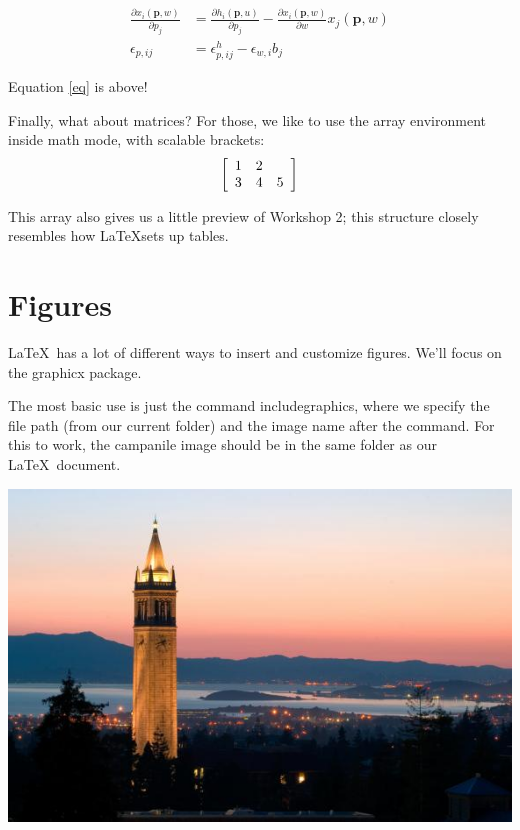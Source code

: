 \documentclass{article}
\begin{document}

\begin{align}
\frac{\partial x_i(\mathbf{p},w)}{\partial p_j}&= \frac{\partial h_i(\mathbf{p},u)}{\partial p_j}-\frac{\partial x_i(\mathbf{p},w)}{\partial w}x_j(\mathbf{p},w) \label{eq} \\
\epsilon_{p,ij} &=\epsilon^h_{p,ij} - \epsilon_{w,i}b_j
\end{align}

Equation \ref{eq} is above!


Finally, what about matrices? For those, we like to use the array environment inside math mode, with scalable brackets:
\[ \left[
\begin{array}{ c c c }
1 & 2 \\
3 & 4 & 5
\end{array} \right]
\]

This array also gives us a little preview of Workshop 2; this structure closely resembles how \LaTeX sets up tables.


\section{Figures}

\LaTeX\ has a lot of different ways to insert and customize figures. We'll focus on the graphicx package.

The most basic use is just the command includegraphics, where we specify the file path (from our current folder) and the image name after the command. For this to work, the campanile image should be in the same folder as our \LaTeX\ document.

\includegraphics[width=\textwidth]{campanile.jpg}
\end{document}
